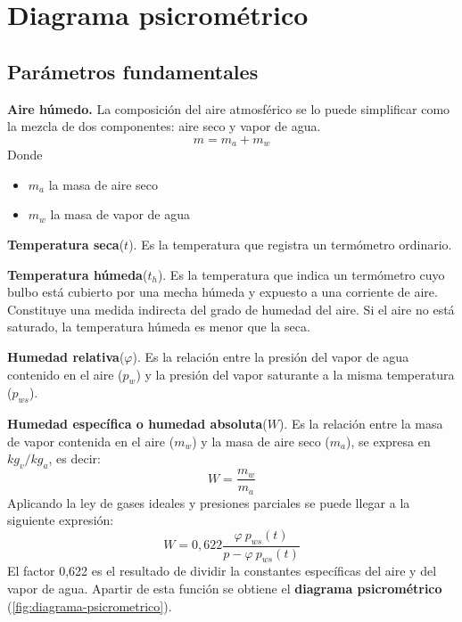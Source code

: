  \chapter{Diagrama psicrom\'etrico}
 \minitoc
        \section{Par\'ametros fundamentales}
        \textbf{Aire h\'umedo.} La composici\'on del aire atmosf\'erico se lo puede simplificar como la mezcla de dos componentes: aire seco y vapor de agua.
        \begin{equation*}
            m = m_a + m_w
        \end{equation*}
        Donde
        \begin{itemize}
            \item $m_a$ la masa de aire seco
            \item $m_w$ la masa de vapor de agua
        \end{itemize}
        \textbf{Temperatura seca}($t$). Es la temperatura que registra un term\'ometro ordinario.

        \textbf{Temperatura h\'umeda}($t_h$). Es la temperatura que indica un term\'ometro cuyo bulbo est\'a cubierto por una mecha h\'umeda y expuesto a una corriente de aire. Constituye una medida indirecta del grado de humedad del aire. Si el aire no est\'a saturado, la temperatura h\'umeda es menor que la seca.

        \textbf{Humedad relativa}($\varphi$). Es la relaci\'on entre la presi\'on del vapor de agua contenido en el aire ($p_w$) y la presi\'on del vapor saturante a la misma temperatura ($p_{ws}$).

        \textbf{Humedad espec\'ifica o humedad absoluta}($W$). Es la relaci\'on entre la masa de vapor contenida en el aire ($m_w$) y la masa de aire seco ($m_a$), se expresa en $kg_v/kg_a$, es decir:
        \begin{equation*}
            W = \frac{m_w}{m_a}
        \end{equation*}
        Aplicando la ley de gases ideales y presiones parciales se puede llegar a la siguiente expresi\'on:
        \begin{equation*}
            W = 0,622\frac{\varphi\ p_{ws}(t)}{p-\varphi\ p_{ws}(t)}
        \end{equation*}
        El factor 0,622 es el resultado de dividir la constantes espec\'ificas del aire y del vapor de agua. Apartir de esta funci\'on se obtiene el \textbf{diagrama psicrom\'etrico} (\autoref{fig:diagrama-psicrometrico}).
       
